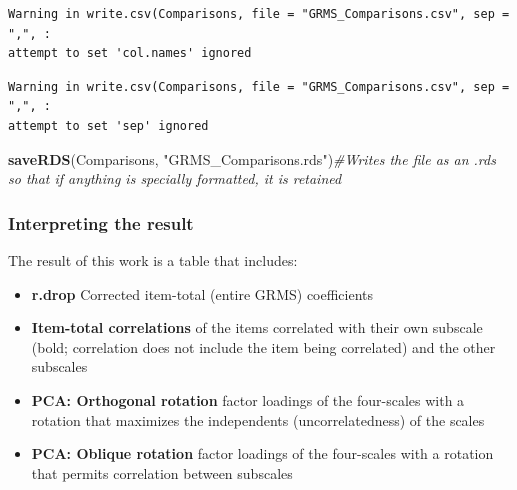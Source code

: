 \documentclass[
  english,
]{book}
\newenvironment{Shaded}{\begin{snugshade}}{\end{snugshade}}
\newcommand{\CommentTok}[1]{\textcolor[rgb]{0.56,0.35,0.01}{\textit{#1}}}
\newcommand{\KeywordTok}[1]{\textcolor[rgb]{0.13,0.29,0.53}{\textbf{#1}}}
\newcommand{\NormalTok}[1]{#1}
\newcommand{\StringTok}[1]{\textcolor[rgb]{0.31,0.60,0.02}{#1}}
\providecommand{\tightlist}{%
  \setlength{\itemsep}{0pt}\setlength{\parskip}{0pt}}
\begin{document}
\begin{verbatim}
Warning in write.csv(Comparisons, file = "GRMS_Comparisons.csv", sep = ",", :
attempt to set 'col.names' ignored
\end{verbatim}

\begin{verbatim}
Warning in write.csv(Comparisons, file = "GRMS_Comparisons.csv", sep = ",", :
attempt to set 'sep' ignored
\end{verbatim}

\begin{Shaded}
\begin{Highlighting}[]
\KeywordTok{saveRDS}\NormalTok{(Comparisons, }\StringTok{"GRMS_Comparisons.rds"}\NormalTok{)}\CommentTok{#Writes the file as an .rds so that if anything is specially formatted, it is retained}
\end{Highlighting}
\end{Shaded}

\hypertarget{interpreting-the-result}{%
\subsubsection{Interpreting the result}\label{interpreting-the-result}}

The result of this work is a table that includes:

\begin{itemize}
\tightlist
\item
  \textbf{r.drop} Corrected item-total (entire GRMS) coefficients
\item
  \textbf{Item-total correlations} of the items correlated with their own subscale (bold; correlation does not include the item being correlated) and the other subscales
\item
  \textbf{PCA: Orthogonal rotation} factor loadings of the four-scales with a rotation that maximizes the independents (uncorrelatedness) of the scales
\item
  \textbf{PCA: Oblique rotation} factor loadings of the four-scales with a rotation that permits correlation between subscales
\end{itemize}
\end{document}
